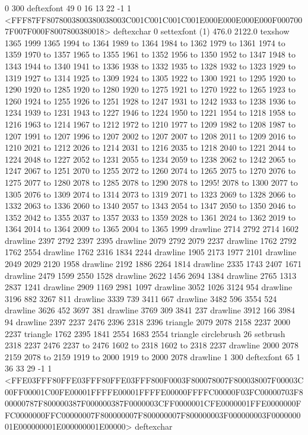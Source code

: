 0 300 deftexfont
49 0 16 13 22 -1 1 {{<FFF87FF8078003800380038003C001C001C001C001E000E000E000E000F0007007F007F000F8007800380018>}} deftexchar
0 settexfont
(1) 476.0 2122.0 texshow
1365 1999 1365 1994 to 1364 1989 to 1364 1984 to 1362 1979 to 1361 1974 to 1359 1970 to 1357 1965 to 1355 1961 to 1352 1956 to 1350 1952 to 1347 1948 to 1343 1944 to 1340 1941 to 1336 1938 to 1332 1935 to 1328 1932 to 1323 1929 to 1319 1927 to 1314 1925 to 1309 1924 to 1305 1922 to 1300 1921 to 1295 1920 to 1290 1920 to 1285 1920 to 1280 1920 to 1275 1921 to 1270 1922 to 1265 1923 to 1260 1924 to 1255 1926 to 1251 1928 to 1247 1931 to 1242 1933 to 1238 1936 to 1234 1939 to 1231 1943 to 1227 1946 to 1224 1950 to 1221 1954 to 1218 1958 to 1216 1963 to 1214 1967 to 1212 1972 to 1210 1977 to 1209 1982 to 1208 1987 to 1207 1991 to 1207 1996 to 1207 2002 to 1207 2007 to 1208 2011 to 1209 2016 to 1210 2021 to 1212 2026 to 1214 2031 to 1216 2035 to 1218 2040 to 1221 2044 to 1224 2048 to 1227 2052 to 1231 2055 to 1234 2059 to 1238 2062 to 1242 2065 to 1247 2067 to 1251 2070 to 1255 2072 to 1260 2074 to 1265 2075 to 1270 2076 to 1275 2077 to 1280 2078 to 1285 2078 to 1290 2078 to 1295!
 2078 to 1300 2077 to 1305 2076 to
 1309 2074 to 1314 2073 to 1319 2071 to 1323 2069 to 1328 2066 to 1332 2063 to 1336 2060 to 1340 2057 to 1343 2054 to 1347 2050 to 1350 2046 to 1352 2042 to 1355 2037 to 1357 2033 to 1359 2028 to 1361 2024 to 1362 2019 to 1364 2014 to 1364 2009 to 1365 2004 to 1365 1999 drawline
2714 2792 2714 1602 drawline
2397 2792 2397 2395 drawline
2079 2792 2079 2237 drawline
1762 2792 1762 2554 drawline
1762 2316 1834 2244 drawline
1905 2173 1977 2101 drawline
2049 2029 2120 1958 drawline
2192 1886 2264 1814 drawline
2335 1743 2407 1671 drawline
2479 1599 2550 1528 drawline
2622 1456 2694 1384 drawline
2765 1313 2837 1241 drawline
2909 1169 2981 1097 drawline
3052 1026 3124 954 drawline
3196 882 3267 811 drawline
3339 739 3411 667 drawline
3482 596 3554 524 drawline
3626 452 3697 381 drawline
3769 309 3841 237 drawline
3912 166 3984 94 drawline
2397 2237 2476 2396 2318 2396 triangle
2079 2078 2158 2237 2000 2237 triangle
1762 2395 1841 2554 1683 2554 triangle
circlebrush 26 setbrush
2318 2237 2476 2237 to 2476 1602 to 2318 1602 to 2318 2237 drawline
2000 2078 2159 2078 to 2159 1919 to 2000 1919 to 2000 2078 drawline
1 300 deftexfont
65 1 36 33 29 -1 1 {{<FFE03FFF80FFE03FFF80FFE03FFF800F0003F800078007F800038007F00003C00FF00001C00FE00001FFFFE00001FFFFE00000FFFFC00000F03FC00000703F800000787F800000387F000000387F0000003CFF0000001CFE0000001FFE0000000FFC0000000FFC00000007F800000007F800000007F800000003F000000003F000000001E000000001E000000001E00000>}} deftexchar
